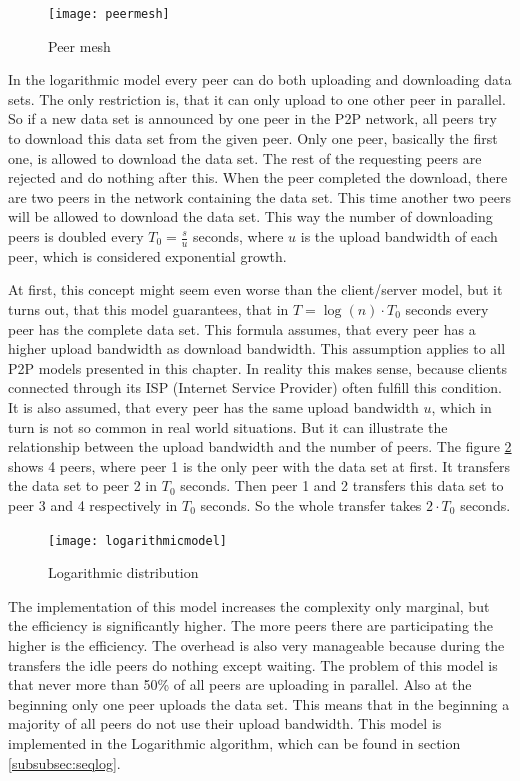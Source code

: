 \begin{figure}[H]
\centering
\texttt{[image: peermesh]}
\caption{Peer mesh}
\label{fig:peermesh}
\end{figure}

In the logarithmic model every peer can do both uploading and downloading data sets. The only restriction is, that it can only upload to one other peer in parallel. So if a new data set is announced by one peer in the P2P network, all peers try to download this data set from the given peer. Only one peer, basically the first one, is allowed to download the data set. The rest of the requesting peers are rejected and do nothing after this. When the peer completed the download, there are two peers in the network containing the data set. This time another two peers will be allowed to download the data set. This way the number of downloading peers is doubled every $T_0 = \frac{s}{u}$ seconds, where $u$ is the upload bandwidth of each peer, which is considered exponential growth.

At first, this concept might seem even worse than the client/server model, but it turns out, that this model guarantees, that in $T=\log{(n)} \cdot T_0$  seconds every peer has the complete data set. This formula assumes, that every peer has a higher upload bandwidth as download bandwidth. This assumption applies to all P2P models presented in this chapter. In reality this makes sense, because clients connected through its ISP (Internet Service Provider) often fulfill this condition. It is also assumed, that every peer has the same upload bandwidth $u$, which in turn is not so common in real world situations. But it can illustrate the relationship between the upload bandwidth and the number of peers. The figure \ref{fig:logarithmicmodel} shows 4 peers, where peer 1 is the only peer with the data set at first. It transfers the data set to peer 2 in $T_0$ seconds. Then peer 1 and 2 transfers this data set to peer 3 and 4 respectively in $T_0$ seconds. So the whole transfer takes $2 \cdot T_0$ seconds.

\begin{figure}[H]
\centering
\texttt{[image: logarithmicmodel]}
\caption{Logarithmic distribution}
\label{fig:logarithmicmodel}
\end{figure}

The implementation of this model increases the complexity only marginal, but the efficiency is significantly higher. The more peers there are participating the higher is the efficiency. The overhead is also very manageable because during the transfers the idle peers do nothing except waiting. The problem of this model is that never more than 50\% of all peers are uploading in parallel. Also at the beginning only one peer uploads the data set. This means that in the beginning a majority of all peers do not use their upload bandwidth. This model is implemented in the Logarithmic algorithm, which can be found in section \ref{subsubsec:seqlog}.

